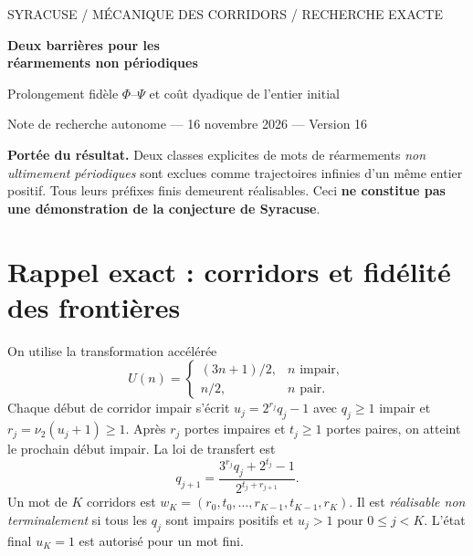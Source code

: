 \documentclass[11pt,a4paper]{article}
\begin{document}
\begin{center}
{\small\sffamily\color{teal} SYRACUSE / MÉCANIQUE DES CORRIDORS / RECHERCHE EXACTE}\par\vspace{5pt}
{\huge\bfseries Deux barrières pour les\\réarmements non périodiques}\par\vspace{8pt}
{\large Prolongement fidèle $\Phi$--$\Psi$ et coût dyadique de l'entier initial}\par\vspace{10pt}
{\small Note de recherche autonome --- 16 novembre 2026 --- Version 16}
\end{center}
\vspace{5pt}
\noindent\colorbox{teal!7}{\parbox{\dimexpr\linewidth-2\fboxsep\relax}{\textbf{Portée du résultat.} Deux classes explicites de mots de réarmements \emph{non ultimement périodiques} sont exclues comme trajectoires infinies d'un même entier positif. Tous leurs préfixes finis demeurent réalisables. Ceci \textbf{ne constitue pas une démonstration de la conjecture de Syracuse}.}}\par
\tableofcontents
\section{Rappel exact : corridors et fidélité des frontières}
On utilise la transformation accélérée
\[
U(n)=\begin{cases}(3n+1)/2,&n\text{ impair},\\n/2,&n\text{ pair}.\end{cases}
\]
Chaque début de corridor impair s'écrit $u_j=2^{r_j}q_j-1$ avec $q_j\ge1$ impair et $r_j=\nu_2(u_j+1)\ge1$. Après $r_j$ portes impaires et $t_j\ge1$ portes paires, on atteint le prochain début impair. La loi de transfert est
\begin{equation}\label{eq:transfert}
\boxed{\displaystyle q_{j+1}=\frac{3^{r_j}q_j+2^{t_j}-1}{2^{t_j+r_{j+1}}}.}
\end{equation}
Un mot de $K$ corridors est $w_K=(r_0,t_0,\dots,r_{K-1},t_{K-1},r_K)$. Il est \emph{réalisable non terminalement} si tous les $q_j$ sont impairs positifs et $u_j>1$ pour $0\le j<K$. L'état final $u_K=1$ est autorisé pour un mot fini.
\end{document}
